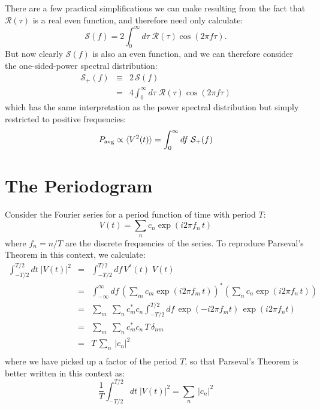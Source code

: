 \documentclass[12pt,oneside]{book}
\begin{document}
There are a few practical simplifications we can make resulting from the fact that $\mathcal{R}(\tau)$
is a real even function, and therefore need only calculate:
\begin{displaymath}
\mathcal{S}(f) =2  \int^{\infty}_{0} d\tau \; \mathcal{R}(\tau) \cos(2\pi f \tau).
\end{displaymath}
But now clearly $\mathcal{S}(f)$ is also an even function, and we can therefore consider the one-sided-power spectral distribution:
\begin{eqnarray}
\mathcal{S}_{+}(f) &\equiv& 2 \, \mathcal{S}(f) \\ 
&=& 4  \int^{\infty}_{0} d\tau \; \mathcal{R}(\tau) \cos(2\pi f \tau) 
\end{eqnarray}
which has the same interpretation as the power spectral distribution but simply restricted to positive frequencies:
\begin{equation}
P_{\rm avg} \propto \braket{V^2(t)} = \int_{0}^{\infty} df \; \mathcal{S}_+(f) 
\end{equation}

\section{The Periodogram}

Consider the Fourier series for a period function of time with period $T$:
\begin{displaymath}
V(t) = \sum_n c_n \exp(i 2 \pi f_n \, t)
\end{displaymath}
where $f_n = n / T$ are the discrete frequencies of the series.
To reproduce Parseval's Theorem in this context, we calculate:
\begin{eqnarray*}
\int_{-T/2}^{T/2} dt \; |V(t)|^2 &=&  \int_{-T/2}^{T/2} df \, V^*(t) \; V(t) \\
&=& \int_{-\infty}^{\infty} df \, \left( \sum_m c_m \exp(i 2 \pi f_m \, t) \right)^*  \left( \sum_n c_n \exp(i 2 \pi f_n \, t) \right) \\
&=& \sum_m \; \sum_n c_m^* c_n \int_{-T/2}^{T/2} df \, \exp(- i 2 \pi f_m t) \, \exp(i 2 \pi f_n t) \\
&=& \sum_m \; \sum_n c_m^* c_n \, T \, \delta_{nm} \\
&=& T \, \sum_n \, |c_n|^2 \\
\end{eqnarray*}
where we have picked up a factor of the period $T$, so that Parseval's Theorem is better written in this context as:
\begin{displaymath}
\frac{1}{T} \int_{-T/2}^{T/2} dt \; |V(t)|^2 = \sum_n \, |c_n|^2 
\end{displaymath}
\end{document}
